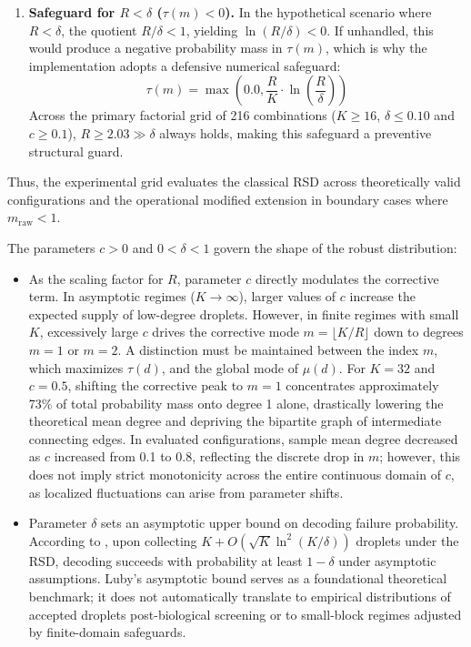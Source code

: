\begin{enumerate}
    \item \textbf{Safeguard for $R < \delta$ ($\tau(m) < 0$).} In the hypothetical scenario where $R < \delta$, the quotient $R/\delta < 1$, yielding $\ln(R/\delta) < 0$. If unhandled, this would produce a negative probability mass in $\tau(m)$, which is why the implementation adopts a defensive numerical safeguard:
    \begin{equation}
        \label{eq:tau_adaptado}
        \tau(m) = \max\left(0.0, \frac{R}{K} \cdot \ln\!\left(\frac{R}{\delta}\right)\right)
    \end{equation}
    Across the primary factorial grid of 216 combinations ($K \ge 16$, $\delta \le 0.10$ and $c \ge 0.1$), $R \ge 2.03 \gg \delta$ always holds, making this safeguard a preventive structural guard.
\end{enumerate}

Thus, the experimental grid evaluates the classical RSD across theoretically valid configurations and the operational modified extension in boundary cases where $m_{\text{raw}} < 1$.

The parameters $c > 0$ and $0 < \delta < 1$ govern the shape of the robust distribution:

\begin{itemize}
    \item As the scaling factor for $R$, parameter $c$ directly modulates the corrective term. In asymptotic regimes ($K \to \infty$), larger values of $c$ increase the expected supply of low-degree droplets. However, in finite regimes with small $K$, excessively large $c$ drives the corrective mode $m = \lfloor K/R \rfloor$ down to degrees $m=1$ or $m=2$. A distinction must be maintained between the index $m$, which maximizes $\tau(d)$, and the global mode of $\mu(d)$. For $K = 32$ and $c = 0.5$, shifting the corrective peak to $m=1$ concentrates approximately 73\% of total probability mass onto degree 1 alone, drastically lowering the theoretical mean degree and depriving the bipartite graph of intermediate connecting edges. In evaluated configurations, sample mean degree decreased as $c$ increased from 0.1 to 0.8, reflecting the discrete drop in $m$; however, this does not imply strict monotonicity across the entire continuous domain of $c$, as localized fluctuations can arise from parameter shifts.
    
    \item Parameter $\delta$ sets an asymptotic upper bound on decoding failure probability. According to , upon collecting $K + O(\sqrt{K}\ln^2(K/\delta))$ droplets under the RSD, decoding succeeds with probability at least $1 - \delta$ under asymptotic assumptions. Luby's asymptotic bound serves as a foundational theoretical benchmark; it does not automatically translate to empirical distributions of accepted droplets post-biological screening or to small-block regimes adjusted by finite-domain safeguards.
\end{itemize}

